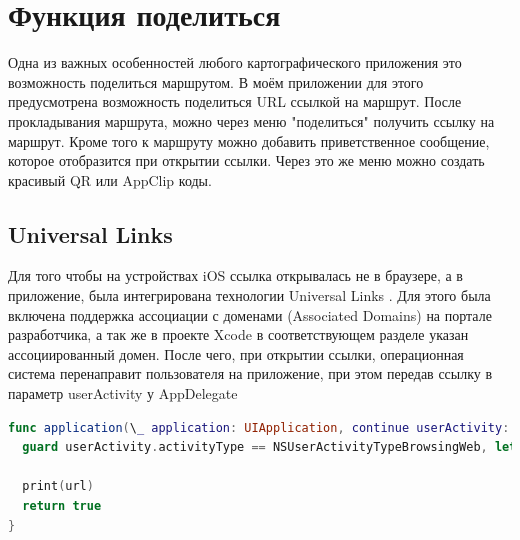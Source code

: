 \chapter{Функция поделиться}
  Одна из важных особенностей любого картографического приложения это возможность поделиться маршрутом. В моём приложении для этого предусмотрена возможность поделиться URL ссылкой на маршрут. После прокладывания маршрута, можно через меню "поделиться" получить ссылку на маршрут. Кроме того к маршруту можно добавить приветственное сообщение, которое отобразится при открытии ссылки. Через это же меню можно создать красивый QR или AppClip коды.

  \section{Universal Links}
    Для того чтобы на устройствах iOS ссылка открывалась не в браузере, а в приложение, была интегрирована технологии Universal Links \cite{UniversalLinks}. Для этого была включена поддержка ассоциации с доменами (Associated Domains) на портале разработчика, а так же в проекте Xcode в соответствующем разделе указан ассоциированный домен. После чего, при открытии ссылки, операционная система перенаправит пользователя на приложение, при этом передав ссылку в параметр userActivity у AppDelegate

    \begin{lstlisting}[language=swift,caption={Получение ссылки из Universal Links}]
func application(\_ application: UIApplication, continue userActivity: NSUserActivity, restorationHandler: [Any?] -> Void) -> Bool {
  guard userActivity.activityType == NSUserActivityTypeBrowsingWeb, let url = userActivity.webpageURL else { return false }

  print(url)
  return true
}
    \end{lstlisting}

